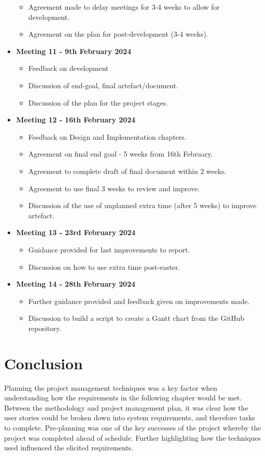 \begin{itemize}
\begin{itemize}
        \item Agreement made to delay meetings for 3-4 weeks to allow for development.
        \item Agreement on the plan for post-development (3-4 weeks).
    \end{itemize}
    \item \textbf{Meeting 11 - 9th February 2024}
    \begin{itemize}
        \item Feedback on development
        \item Discussion of end-goal, final artefact/document.
        \item Discussion of the plan for the project stages.
    \end{itemize}
    \item \textbf{Meeting 12 - 16th February 2024}
    \begin{itemize}
        \item Feedback on Design and Implementation chapters.
        \item Agreement on final end goal - 5 weeks from 16th February.
        \item Agreement to complete draft of final document within 2 weeks.
        \item Agreement to use final 3 weeks to review and improve.
        \item Discussion of the use of unplanned extra time (after 5 weeks) to improve artefact.
    \end{itemize}
    \item \textbf{Meeting 13 - 23rd February 2024}
    \begin{itemize}
        \item Guidance provided for last improvements to report.
        \item Discussion on how to use extra time post-easter.
    \end{itemize}
    \item \textbf{Meeting 14 - 28th February 2024}
    \begin{itemize}
        \item Further guidance provided and feedback given on improvements made.
        \item Discussion to build a script to create a Gantt chart from the GitHub repository.
    \end{itemize}
\end{itemize}

\section{Conclusion}
\label{pm:conclusion}

Planning the project management techniques was a key factor when understanding how the requirements in the following chapter would be met. Between the methodology and project management plan, it was clear how the user stories could be broken down into system requirements, and therefore tasks to complete. Pre-planning was one of the key successes of the project whereby the project was completed ahead of schedule. Further highlighting how the techniques used influenced the elicited requirements.